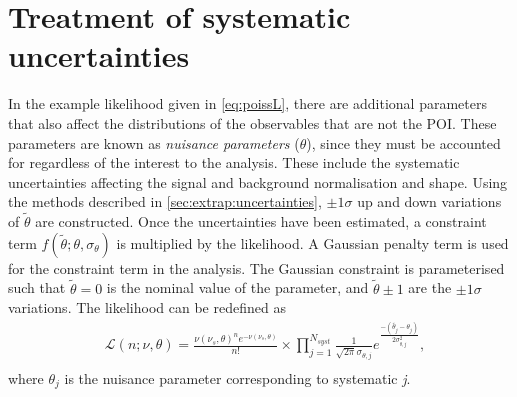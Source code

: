 \section{Treatment of systematic uncertainties}\label{sec:stats:nps}
In the example likelihood given in \cref{eq:poissL}, there are additional parameters that also affect the distributions of the observables that are not the POI. These parameters are known as \emph{nuisance parameters} ($\theta$), since they must be accounted for regardless of the interest to the analysis. These include the systematic uncertainties affecting the signal and background normalisation and shape. Using the methods described in \cref{sec:extrap:uncertainties}, $\pm 1\sigma$ up and down variations of $\tilde{\theta}$ are constructed. Once the uncertainties have been estimated, a constraint term $f(\tilde{\theta};\theta,\sigma_\theta)$ is multiplied by the likelihood. A Gaussian penalty term is used for the constraint term in the analysis. The Gaussian constraint is parameterised such that $\tilde{\theta} = 0$ is the nominal value of the parameter, and $\tilde{\theta} \pm 1$ are the $\pm1\sigma$ variations. The likelihood can be redefined as
\begin{equation}
    \label{eq:likelihood}
    \begin{aligned}
        & \mathcal{L}(n;\nu,\theta) = \frac{\nu(\nu_s,\theta)^{n} e^{-\nu(\nu_s,\theta)}}{n!} \times \prod_{j=1}^{N_{syst}} \frac{1}{\sqrt{2\pi}\sigma_{\theta,j}} e^\frac{-(\tilde{\theta_j} - \theta_j)}{2\sigma_{\theta,j}^2} , \\
    \end{aligned}
\end{equation}
where $\theta_j$ is the nuisance parameter corresponding to systematic \emph{j}. 

